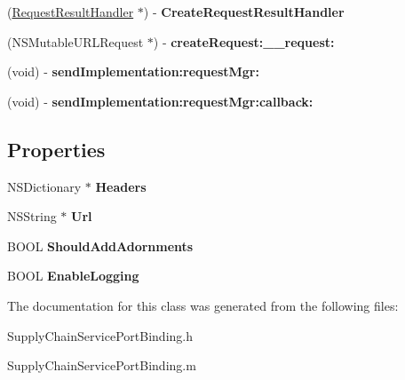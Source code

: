 \begin{DoxyCompactItemize}
\item 
\hypertarget{interface_supply_chain_service_port_binding_adaff0668be05156e77c56dd626e378ba}{}(\hyperlink{interface_request_result_handler}{Request\+Result\+Handler} $\ast$) -\/ {\bfseries Create\+Request\+Result\+Handler}\label{interface_supply_chain_service_port_binding_adaff0668be05156e77c56dd626e378ba}

\item 
\hypertarget{interface_supply_chain_service_port_binding_a1c458a78ed10f16505edbe7bf67b2f3a}{}(N\+S\+Mutable\+U\+R\+L\+Request $\ast$) -\/ {\bfseries create\+Request\+:\+\_\+\+\_\+request\+:}\label{interface_supply_chain_service_port_binding_a1c458a78ed10f16505edbe7bf67b2f3a}

\item 
\hypertarget{interface_supply_chain_service_port_binding_a7ef49d907149cb2be13ec45fdee6c8e6}{}(void) -\/ {\bfseries send\+Implementation\+:request\+Mgr\+:}\label{interface_supply_chain_service_port_binding_a7ef49d907149cb2be13ec45fdee6c8e6}

\item 
\hypertarget{interface_supply_chain_service_port_binding_a8b17742c3895fbfa568c292096053525}{}(void) -\/ {\bfseries send\+Implementation\+:request\+Mgr\+:callback\+:}\label{interface_supply_chain_service_port_binding_a8b17742c3895fbfa568c292096053525}

\end{DoxyCompactItemize}
\subsection*{Properties}
\begin{DoxyCompactItemize}
\item 
\hypertarget{interface_supply_chain_service_port_binding_a43b821946d0d6781f02552feccd11193}{}N\+S\+Dictionary $\ast$ {\bfseries Headers}\label{interface_supply_chain_service_port_binding_a43b821946d0d6781f02552feccd11193}

\item 
\hypertarget{interface_supply_chain_service_port_binding_a42bf2e82407fdd1d7bc690968bac47eb}{}N\+S\+String $\ast$ {\bfseries Url}\label{interface_supply_chain_service_port_binding_a42bf2e82407fdd1d7bc690968bac47eb}

\item 
\hypertarget{interface_supply_chain_service_port_binding_a8484be892e50aab1bb9589fb51210cb7}{}B\+O\+O\+L {\bfseries Should\+Add\+Adornments}\label{interface_supply_chain_service_port_binding_a8484be892e50aab1bb9589fb51210cb7}

\item 
\hypertarget{interface_supply_chain_service_port_binding_a4843fee2a22afe2e0c5cadf781453a5e}{}B\+O\+O\+L {\bfseries Enable\+Logging}\label{interface_supply_chain_service_port_binding_a4843fee2a22afe2e0c5cadf781453a5e}

\end{DoxyCompactItemize}


The documentation for this class was generated from the following files\+:\begin{DoxyCompactItemize}
\item 
Supply\+Chain\+Service\+Port\+Binding.\+h\item 
Supply\+Chain\+Service\+Port\+Binding.\+m\end{DoxyCompactItemize}
